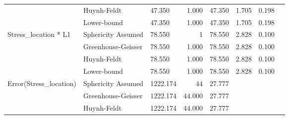 \documentclass[a4paper]{article}
\begin{document}
\begin{table}[H]
\begin{center}
\begin{tabular}{p{}p{}|l|r|r|r|r|r|}
\cline{2-7}
                                                        & Huynh-Feldt        & 47.350                                       & 1.000                   & 47.350                           & 1.705                  & 0.198                      \\ 
\cline{2-7}
                                                        & Lower-bound        & 47.350                                       & 1.000                   & 47.350                           & 1.705                  & 0.198                      \\ 
\hline
\multirow{4}{*}{Stress\_location * L1}                  & Sphericity Assumed & 78.550                                       & 1                       & 78.550                           & 2.828                  & 0.100                      \\ 
\cline{2-7}
                                                        & Greenhouse-Geisser & 78.550                                       & 1.000                   & 78.550                           & 2.828                  & 0.100                      \\ 
\cline{2-7}
                                                        & Huynh-Feldt        & 78.550                                       & 1.000                   & 78.550                           & 2.828                  & 0.100                      \\ 
\cline{2-7}
                                                        & Lower-bound        & 78.550                                       & 1.000                   & 78.550                           & 2.828                  & 0.100                      \\ 
\hline
\multirow{4}{*}{Error(Stress\_location)}                & Sphericity Assumed & 1222.174                                     & 44                      & 27.777                           & \multicolumn{1}{l|}{~} & \multicolumn{1}{l|}{~}     \\ 
\cline{2-7}
                                                        & Greenhouse-Geisser & 1222.174                                     & 44.000                  & 27.777                           & \multicolumn{1}{l|}{~} & \multicolumn{1}{l|}{~}     \\ 
\cline{2-7}
                                                        & Huynh-Feldt        & 1222.174                                     & 44.000                  & 27.777                           & \multicolumn{1}{l|}{~} & \multicolumn{1}{l|}{~}     \\ 

\end{tabular}
\end{center}
\end{table}
\end{document}
